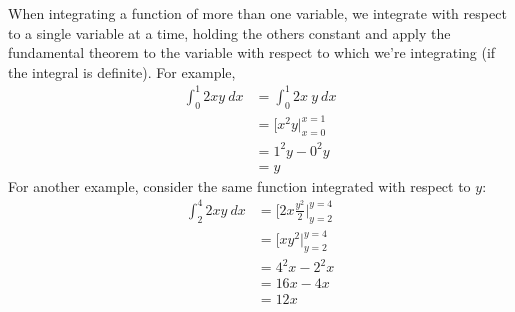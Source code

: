 When integrating a function of more than one variable, we integrate with respect to a single 
variable at a time, holding the others constant and apply the fundamental theorem to the variable 
with respect to which we're integrating (if the integral is definite). For example, 
\begin{equation*}
    \begin{aligned}
        \int_0^1 2x y\ dx & = \int_0^1 \boxed{2x}\ y\ dx \\ 
        & = \Big[x^2 y \Big|_{x = 0}^{x = 1}  \\ 
        & = 1^2 y - 0^2 y \\ 
        & = y
    \end{aligned}
\end{equation*}
For another example, consider the same function integrated with respect to $y$:
\begin{equation*}
    \begin{aligned}
        \int_2^4 2xy\ dx & = \Big[2x \frac{y^2}{2} \Big|_{y = 2}^{y = 4}  \\ 
         & = \Big[x y^2 \Big|_{y = 2}^{y = 4}  \\ 
        & = 4^2 x -  2^2 x \\ 
        & = 16 x - 4 x \\ 
        & = 12x
    \end{aligned}
\end{equation*}

